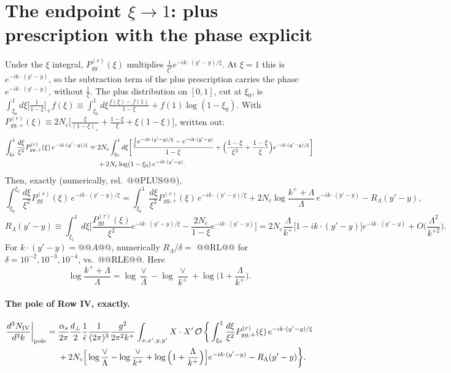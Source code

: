 \documentclass[10pt]{article}
\numberwithin{equation}{section}
\newcommand{\OO}{\mathcal O}
\newcommand{\pre}{\frac{1}{(2\pi)^3}\frac{g^2}{2\pi^2k^+}}
\begin{document}
\section{The endpoint \texorpdfstring{$\xi\to1$}{xi to 1}: plus prescription with the phase explicit}\label{sec:plus}
Under the $\xi$ integral, $P^{(r)}_{gg}(\xi)$ multiplies $\frac{1}{\xi^2}e^{-ik\cdot(y'-y)/\xi}$. At $\xi=1$ this is $e^{-ik\cdot(y'-y)}$, so the subtraction term of the plus prescription carries the phase $e^{-ik\cdot(y'-y)}$, without $\frac1\xi$. The plus distribution on $[0,1]$, cut at $\xi_0$, is $\int_{\xi_0}^1d\xi\big[\frac{1}{1-\xi}\big]_+f(\xi)\equiv\int_{\xi_0}^1d\xi\frac{f(\xi)-f(1)}{1-\xi}+f(1)\log(1-\xi_0)$. With $P^{(r)}_{gg,+}(\xi)\equiv2N_c\big[\frac{\xi}{(1-\xi)_+}+\frac{1-\xi}{\xi}+\xi(1-\xi)\big]$, written out:
\begin{align}
\int_{\xi_0}^1\frac{d\xi}{\xi^2}P^{(r)}_{gg,+}(\xi)\,e^{-ik\cdot(y'-y)/\xi}\equiv{}&2N_c\int_{\xi_0}^1d\xi\bigg[\frac{\frac{1}{\xi}e^{-ik\cdot(y'-y)/\xi}-e^{-ik\cdot(y'-y)}}{1-\xi}+\Big(\frac{1-\xi}{\xi^3}+\frac{1-\xi}{\xi}\Big)e^{-ik\cdot(y'-y)/\xi}\bigg]\notag\\
&+2N_c\log(1-\xi_0)\,e^{-ik\cdot(y'-y)}.
\label{eq:plusdef}
\end{align}
Then, exactly (numerically, rel.\ @@PLUS@@),
\begin{equation}
\int_{\xi_0}^{\xi_1}\frac{d\xi}{\xi^2}P^{(r)}_{gg}(\xi)\,e^{-ik\cdot(y'-y)/\xi}=\int_{\xi_0}^1\frac{d\xi}{\xi^2}P^{(r)}_{gg,+}(\xi)\,e^{-ik\cdot(y'-y)/\xi}+2N_c\log\frac{k^++\Lambda}{\Lambda}\,e^{-ik\cdot(y'-y)}-R_\Lambda(y'-y),
\label{eq:plusid}
\end{equation}
\begin{equation}
R_\Lambda(y'-y)\equiv\int_{\xi_1}^1d\xi\Big[\frac{P^{(r)}_{gg}(\xi)}{\xi^2}e^{-ik\cdot(y'-y)/\xi}-\frac{2N_c}{1-\xi}e^{-ik\cdot(y'-y)}\Big]=2N_c\frac{\Lambda}{k^+}\big[1-ik\cdot(y'-y)\big]e^{-ik\cdot(y'-y)}+O\Big(\frac{\Lambda^2}{k^{+2}}\Big).
\label{eq:RL}
\end{equation}
For $k\cdot(y'-y)=@@A@@$, numerically $R_\Lambda/\delta=$ @@RL@@ for $\delta=10^{-2},10^{-3},10^{-4}$, vs.\ @@RLE@@. Here
\begin{equation}
\log\frac{k^++\Lambda}{\Lambda}=\log\frac{\vee}{\Lambda}-\log\frac{\vee}{k^+}+\log\Big(1+\frac{\Lambda}{k^+}\Big).
\end{equation}

\paragraph{The pole of Row IV, exactly.}
\begin{align}
\frac{d^3N_{\rm IV}}{d^3k}\bigg|_{\rm pole}={}&\frac{\alpha_s}{2\pi}\frac{d_\perp}{2}\frac{1}{\bar\epsilon}\pre\int_{x,x',y,y'}X\cdot X'\,\OO\,\bigg\{\int_{\xi_0}^1\frac{d\xi}{\xi^2}P^{(r)}_{gg,+}(\xi)\,e^{-ik\cdot(y'-y)/\xi}\notag\\
&+2N_c\Big[\log\frac{\vee}{\Lambda}-\log\frac{\vee}{k^+}+\log\Big(1+\frac{\Lambda}{k^+}\Big)\Big]e^{-ik\cdot(y'-y)}-R_\Lambda(y'-y)\bigg\}.
\label{eq:poleplus}
\end{align}
\end{document}

